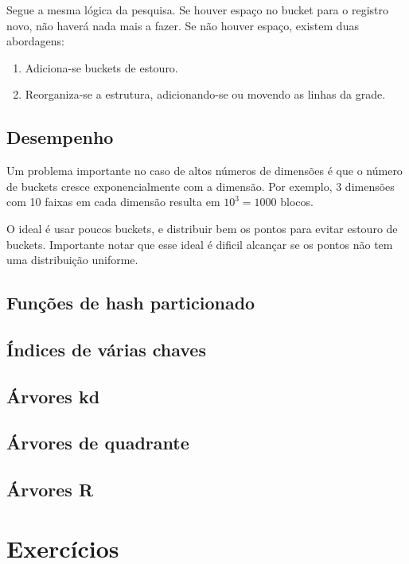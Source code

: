 Segue a mesma lógica da pesquisa. Se houver espaço no bucket para o registro novo,
não haverá nada mais a fazer.
Se não houver espaço, existem duas abordagens:
\begin{enumerate}
\item Adiciona-se buckets de estouro.
\item Reorganiza-se a estrutura, adicionando-se ou movendo as linhas da grade.
\end{enumerate}

\subsection{Desempenho}

Um problema importante no caso de altos números de dimensões é que o número de buckets
cresce exponencialmente com a dimensão. Por exemplo, 3 dimensões com 10 faixas em cada dimensão
resulta em $10^3 = 1000$ blocos.

O ideal é usar poucos buckets, e distribuir bem os pontos para evitar estouro
de buckets.  Importante notar que esse ideal é dificil alcançar se os pontos
não tem uma distribuição uniforme.

\subsection{Funções de hash particionado}

\subsection{Índices de várias chaves}

\subsection{Árvores kd}

\subsection{Árvores de quadrante}

\subsection{Árvores R}

\section{Exercícios}

